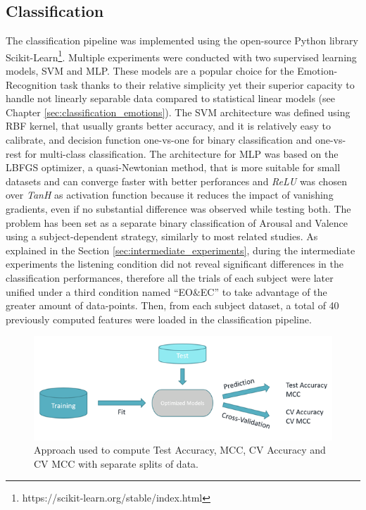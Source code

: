 \subsection{Classification}
\label{sec:classification}
The classification pipeline was implemented using the open-source Python library Scikit-Learn\footnote{https://scikit-learn.org/stable/index.html}. Multiple experiments were conducted with two supervised learning models, \ac{SVM} and \ac{MLP}. These models are a popular choice for the Emotion-Recognition task thanks to their relative simplicity yet their superior capacity to handle not linearly separable data compared to statistical linear models (see Chapter \ref{sec:classification_emotions}). The \ac{SVM} architecture was defined using RBF kernel, that usually grants better accuracy, and it is relatively easy to calibrate, and decision function one-vs-one for binary classification and one-vs-rest for multi-class classification. The architecture for \ac{MLP} was based on the LBFGS optimizer, a quasi-Newtonian method, that is more suitable for small datasets and can converge faster with better perforances and \emph{ReLU} was chosen over \emph{TanH} as activation function because it reduces the impact of vanishing gradients, even if no substantial difference was observed while testing both. The problem has been set as a separate binary classification of Arousal and Valence using a subject-dependent strategy, similarly to most related studies. As explained in the Section \ref{sec:intermediate_experiments}, during the intermediate experiments the listening condition did not reveal significant differences in the classification performances, therefore all the trials of each subject were later unified under a third condition named “EO\&EC” to take advantage of the greater amount of data-points. Then, from each subject dataset, a total of 40 previously computed features were loaded in the classification pipeline.
\begin{figure}[h!]
\includegraphics[width=12cm]{img/methods/data_split_strategy.png}
\centering
\caption{Approach used to compute Test Accuracy, MCC, CV Accuracy and CV MCC with separate splits of data.} \label{fig_data_split_strategy}
\end{figure}
